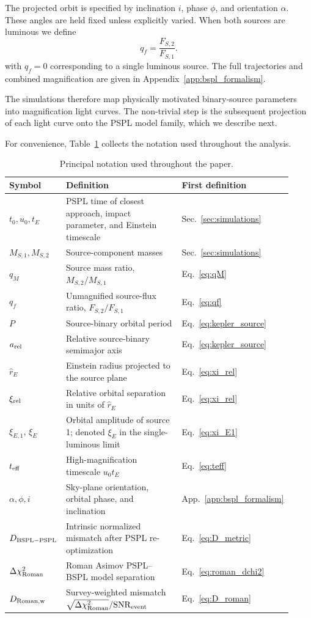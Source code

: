 \documentclass{article}
\begin{document}
The projected orbit is specified by inclination $i$, phase $\phi$, and
orientation $\alpha$. These angles are held fixed unless explicitly
varied. When both sources are luminous we define
\begin{equation}
q_f=\frac{F_{S,2}}{F_{S,1}}.
\label{eq:qf}
\end{equation}
with $q_f=0$ corresponding to a single luminous source. The full
trajectories and combined magnification are given in
Appendix~\ref{app:bspl_formalism}.

The simulations therefore map physically motivated binary-source
parameters into magnification light curves. The non-trivial step is the
subsequent projection of each light curve onto the PSPL model family,
which we describe next.

For convenience, Table~\ref{tab:notation} collects the notation used
throughout the analysis.

\begin{table}[t]
\centering
\small
\caption{Principal notation used throughout the paper.}
\label{tab:notation}
\begin{tabular}{p{0.20\linewidth}p{0.57\linewidth}p{0.15\linewidth}}
\toprule
Symbol & Definition & First definition \\
\midrule
$t_0,u_0,t_E$ & PSPL time of closest approach, impact parameter, and Einstein timescale & Sec.~\ref{sec:simulations} \\
$M_{S,1},M_{S,2}$ & Source-component masses & Sec.~\ref{sec:simulations} \\
$q_M$ & Source mass ratio, $M_{S,2}/M_{S,1}$ & Eq.~\ref{eq:qM} \\
$q_f$ & Unmagnified source-flux ratio, $F_{S,2}/F_{S,1}$ & Eq.~\ref{eq:qf} \\
$P$ & Source-binary orbital period & Eq.~\ref{eq:kepler_source} \\
$a_{\rm rel}$ & Relative source-binary semimajor axis & Eq.~\ref{eq:kepler_source} \\
$\hat r_E$ & Einstein radius projected to the source plane & Eq.~\ref{eq:xi_rel} \\
$\xi_{\rm rel}$ & Relative orbital separation in units of $\hat r_E$ & Eq.~\ref{eq:xi_rel} \\
$\xi_{E,1}$, $\xi_E$ & Orbital amplitude of source 1; denoted $\xi_E$ in the single-luminous limit & Eq.~\ref{eq:xi_E1} \\
$t_{\rm eff}$ & High-magnification timescale $u_0t_E$ & Eq.~\ref{eq:teff} \\
$\alpha,\phi,i$ & Sky-plane orientation, orbital phase, and inclination & App.~\ref{app:bspl_formalism} \\
$D_{\rm BSPL-PSPL}$ & Intrinsic normalized mismatch after PSPL re-optimization & Eq.~\ref{eq:D_metric} \\
$\Delta\chi^2_{\rm Roman}$ & Roman Asimov PSPL--BSPL model separation & Eq.~\ref{eq:roman_dchi2} \\
$D_{\rm Roman,w}$ & Survey-weighted mismatch $\sqrt{\Delta\chi^2_{\rm Roman}}/{\rm SNR}_{\rm event}$ & Eq.~\ref{eq:D_roman} \\
\bottomrule
\end{tabular}
\end{table}
\end{document}
